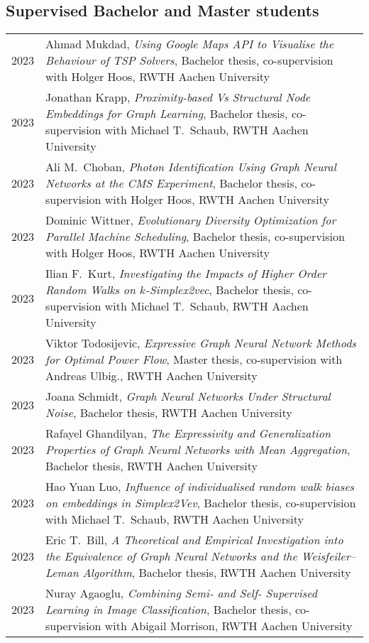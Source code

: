 \documentclass[11pt, a4paper, DIV=14, headings=small]{scrartcl}
\begin{document}
	\subsection*{Supervised Bachelor and Master students}
	\begin{longtabu}{p{2.1cm}p{12.0cm}}
		2023 & Ahmad Mukdad, \emph{Using Google Maps API to Visualise the Behaviour of TSP Solvers}, Bachelor thesis, co-supervision with Holger Hoos, RWTH Aachen University \\
	   2023 & Jonathan Krapp, \emph{Proximity-based Vs Structural Node Embeddings for Graph Learning}, Bachelor thesis, co-supervision with Michael T.\ Schaub, RWTH Aachen University \\		
		2023 & Ali M.\ Choban, \emph{Photon Identification Using Graph Neural Networks at the CMS Experiment}, Bachelor thesis, co-supervision with Holger Hoos, RWTH Aachen University \\
		2023 & Dominic Wittner, \emph{Evolutionary Diversity Optimization for Parallel Machine Scheduling}, Bachelor thesis, co-supervision with Holger Hoos, RWTH Aachen University \\
        2023 & Ilian F.\ Kurt, \emph{Investigating the Impacts of Higher Order Random Walks on $k$-Simplex2vec}, Bachelor thesis, co-supervision with Michael T.\ Schaub, RWTH Aachen University \\		
		2023 & Viktor Todosijevic, \emph{Expressive Graph Neural Network Methods for Optimal Power Flow}, Master thesis, co-supervision with Andreas Ulbig., RWTH Aachen University \\	
		2023 & Joana Schmidt, \emph{Graph Neural Networks Under Structural Noise}, Bachelor thesis, RWTH Aachen University \\	
		2023 & Rafayel Ghandilyan, \emph{The Expressivity and Generalization Properties of Graph Neural Networks with Mean Aggregation}, Bachelor thesis, RWTH Aachen University \\	
		2023 & Hao Yuan Luo, \emph{Influence of individualised random walk biases on embeddings in Simplex2Vev}, Bachelor thesis, co-supervision with Michael T.\ Schaub, RWTH Aachen University \\	
		2023 & Eric T.\ Bill, \emph{A Theoretical and Empirical Investigation into the Equivalence of Graph Neural Networks and the Weisfeiler--Leman Algorithm}, Bachelor thesis, RWTH Aachen University\\    
		2023 & Nuray Agaoglu, \emph{Combining Semi- and Self- Supervised Learning in Image Classification}, Bachelor thesis, co-supervision with Abigail Morrison, RWTH Aachen University\\    

\end{longtabu}
\end{document}
